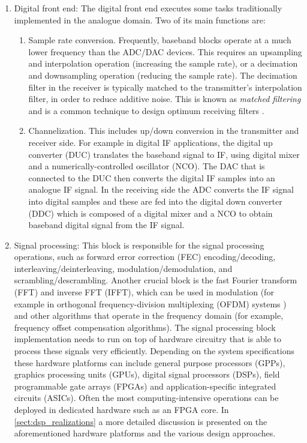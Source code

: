 \begin{enumerate}
  \item Digital front end: The digital front end executes some tasks traditionally implemented in the analogue domain. Two of its main functions are\cite{digital_frontend_sdr}:
  \begin{enumerate}
    \item  Sample rate conversion. Frequently, baseband blocks operate at a much lower frequency than the ADC/DAC devices. This requires an upsampling and interpolation operation (increasing the sample rate), or a decimation and downsampling operation (reducing the sample rate). The decimation filter in the receiver is typically matched to the transmitter's interpolation filter, in order to reduce additive noise. This is known as \emph{matched filtering} and is a common technique to design optimum receiving filters \cite{communication_systems_carlson}.
    \item Channelization. This includes up/down conversion in the transmitter and receiver side. For example in digital IF applications, the digital up converter (DUC) translates the baseband signal to IF, using digital mixer and a numerically-controlled oscillator (NCO). The DAC that is connected to the DUC then converts the digital IF samples into an analogue IF signal. In the receiving side the ADC converts the IF signal into digital samples and these are fed into the digital down converter (DDC) which is composed of a digital mixer and a NCO to obtain baseband digital signal from the IF signal.
  \end{enumerate}

  \item Signal processing: This block is responsible for the signal processing operations, such as forward error correction (FEC) encoding/decoding, interleaving/deinterleaving, modulation/demodulation, and scrambling/descrambling. Another crucial block is the fast Fourier transform (FFT) and inverse FFT (IFFT), which can be used in modulation (for example in orthogonal frequency-division multiplexing (OFDM) systems \cite{ofdm_baseband_receiver}) and other algorithms that operate in the frequency domain (for example, frequency offset compensation algorithms). The signal processing block implementation needs to run on top of hardware circuitry that is able to process these signals very efficiently. Depending on the system specifications these hardware platforms can include general purpose processors (GPPs), graphics processing units (GPUs), digital signal processors (DSPs), field programmable gate arrays (FPGAs) and application-specific integrated circuits (ASICs). Often the most computing-intensive operations can be deployed in dedicated hardware such as an FPGA core. In \autoref{sect:dsp_realizations} a more detailed discussion is presented on the aforementioned hardware platforms and the various design approaches.
\end{enumerate}

